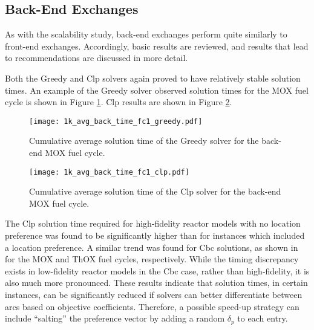 \subsection{Back-End Exchanges}

As with the scalability study, back-end exchanges perform quite similarly to
front-end exchanges. Accordingly, basic results are reviewed, and results that
lead to recommendations are discussed in more detail.


Both the Greedy and Clp solvers again proved to have relatively stable solution
times. An example of the Greedy solver observed solution times for the MOX fuel
cycle is shown in Figure \ref{fig:1k_avg_back_time_fc1_greedy}. Clp results are
shown in Figure \ref{fig:1k_avg_back_time_fc1_clp}. 

\begin{figure}[h!]
  \begin{center}
    \texttt{[image: 1k\_avg\_back\_time\_fc1\_greedy.pdf]}
    \caption{
      \label{fig:1k_avg_back_time_fc1_greedy}
      Cumulative average solution time of the Greedy solver for the back-end MOX
      fuel cycle.}
  \end{center}
\end{figure}

\begin{figure}[h!]
  \begin{center}
    \texttt{[image: 1k\_avg\_back\_time\_fc1\_clp.pdf]}
    \caption{
      \label{fig:1k_avg_back_time_fc1_clp}
      Cumulative average solution time of the Clp solver for the back-end MOX
      fuel cycle.}
  \end{center}
\end{figure}

The Clp solution time required for high-fidelity reactor models with no location
preference was found to be significantly higher than for instances which
included a location preference. A similar trend was found for Cbc solutions, as
shown in  for
the MOX and ThOX fuel cycles, respectively. While the timing discrepancy exists
in low-fidelity reactor models in the Cbc case, rather than high-fidelity, it is
also much more pronounced. These results indicate that solution times, in
certain instances, can be significantly reduced if solvers can better
differentiate between arcs based on objective coefficients. Therefore, a
possible speed-up strategy can include ``salting'' the preference vector by
adding a random $\delta_p$ to each entry.

